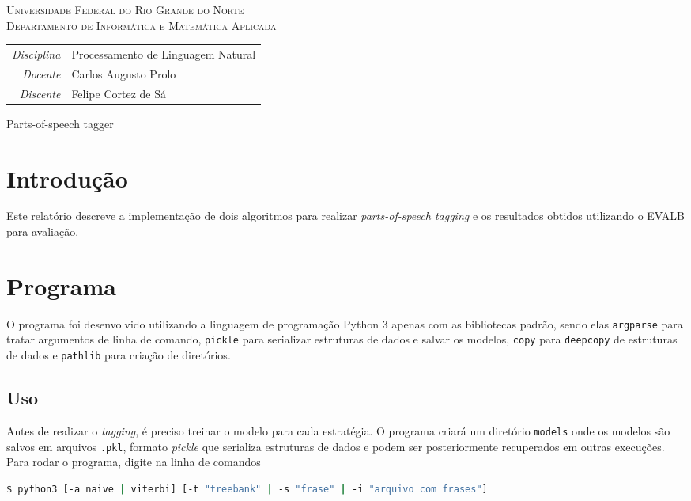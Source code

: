 \documentclass[12pt, a4paper]{article}
\newcommand{\code}[1]{{\lstinline{#1}}}
\begin{document}
\begin{center}
    \textsc{Universidade Federal do Rio Grande do Norte} \\
    \textsc{Departamento de Informática e Matemática Aplicada}
\end{center}

\bigskip

\begin{tabular}{@{}rl@{}}
    \emph{Disciplina} & Processamento de Linguagem Natural \\
    \emph{Docente}    & Carlos Augusto Prolo \\
    \emph{Discente}   & Felipe Cortez de Sá \\
\end{tabular}

\bigskip

\begin{center}
\large Parts-of-speech tagger
\end{center}

\section{Introdução}
Este relatório descreve a implementação de dois algoritmos para realizar
\emph{parts-of-speech tagging} e os resultados obtidos utilizando o EVALB para
avaliação. 

\section{Programa}
O programa foi desenvolvido utilizando a linguagem de programação Python 3
apenas com as bibliotecas padrão, sendo elas \code{argparse} para tratar
argumentos de linha de comando, \code{pickle} para serializar estruturas de
dados e salvar os modelos, \code{copy} para \code{deepcopy} de estruturas de
dados e \code{pathlib} para criação de diretórios.

\subsection{Uso}
Antes de realizar o \emph{tagging}, é preciso treinar o modelo para cada
estratégia. O programa criará um diretório \code{models} onde os modelos são
salvos em arquivos \code{.pkl}, formato \emph{pickle} que serializa estruturas
de dados e podem ser posteriormente recuperados em outras execuções. Para rodar
o programa, digite na linha de comandos

\begin{lstlisting}[language=bash]
$ python3 [-a naive | viterbi] [-t "treebank" | -s "frase" | -i "arquivo com frases"]
\end{lstlisting}
\end{document}
